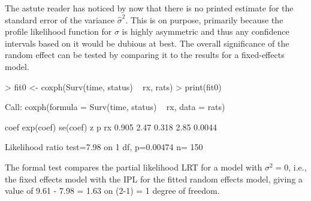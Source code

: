 \documentclass{article}
\begin{document}
The astute reader has noticed by now that there is no printed estimate for
the standard error of the variance $\hat\sigma^2$.  This is on purpose,
primarily because the profile likelihood function for $\sigma$ is 
highly asymmetric and thus any confidence intervals based on it would be
dubious at best.  
The overall significance of the random effect can be tested by comparing it
to the results for a fixed-effects model.
\begin{Schunk}
\begin{Sinput}
> fit0 <- coxph(Surv(time, status) ~ rx, rats)
> print(fit0)
\end{Sinput}
\begin{Soutput}
Call:
coxph(formula = Surv(time, status) ~ rx, data = rats)


    coef exp(coef) se(coef)    z      p
rx 0.905      2.47    0.318 2.85 0.0044

Likelihood ratio test=7.98  on 1 df, p=0.00474  n= 150 
\end{Soutput}
\end{Schunk}
The formal test compares the partial likelihood LRT for a model with
$\sigma^2=0$, i.e., the fixed effects model with the IPL for the
fitted random effects model, giving a value of 9.61 - 7.98 = 1.63 on
(2-1) = 1 degree of freedom.
\end{document}
